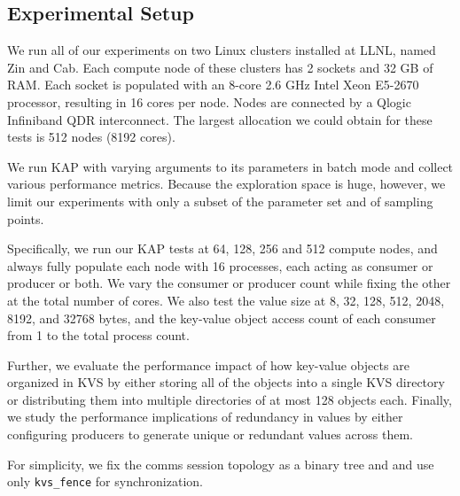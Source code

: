 \subsection{Experimental Setup}
We run all of our experiments on two Linux clusters installed at LLNL,
named Zin and Cab.
Each compute node of these clusters has 2 sockets and 32 GB of RAM.
Each socket is populated with an 8-core 2.6 GHz Intel
Xeon E5-2670 processor, resulting in 16 cores per node.
Nodes are connected by a Qlogic Infiniband QDR interconnect.
The largest allocation we could obtain for these tests is
512 nodes (8192 cores).

We run KAP with varying arguments to its parameters
in batch mode and collect various 
performance metrics. 
Because the exploration
space is huge, however, we limit our experiments with
only a subset of the parameter set and of sampling points.

Specifically, we run our KAP tests at 64, 128, 256 and 512
compute nodes, and always fully populate each node with
16 processes, each acting as consumer or producer or
both. We vary the consumer or producer count
while fixing the other at the total number of cores.
We also test the value size at
8, 32, 128, 512, 2048, 8192, and 32768 bytes,
and the key-value object access count of each consumer
from 1 to the total process count.

Further, we evaluate the performance impact 
of how key-value objects are organized 
in KVS by either storing all of the objects into a single KVS directory
or distributing them into multiple directories of at most 128 objects each.
Finally, we study the performance implications of 
redundancy in values by either configuring producers to generate
unique or redundant values across them.

For simplicity, we fix the comms session topology as a binary tree
and and use only {\tt kvs\_fence} for synchronization.
